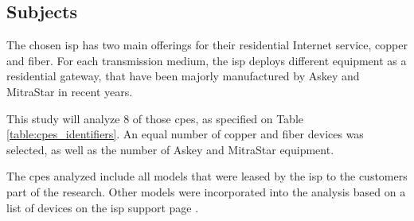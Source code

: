 \subsection{Subjects}

The chosen \gls{isp} has two main offerings for their residential Internet service, copper and fiber. For each transmission medium, the \gls{isp} deploys different equipment as a residential gateway, that have been majorly manufactured by Askey and MitraStar in recent years.

This study will analyze 8 of those \gls{cpe}s, as specified on Table \ref{table:cpes_identifiers}. An equal number of copper and fiber devices was selected, as well as the number of Askey and MitraStar equipment.

\begin{table}[h]
    \caption{Identifiers of the \gls{cpe}s}
    \label{table:cpes_identifiers}
\end{table}

The \glspl{cpe} analyzed include all models that were leased by the \gls{isp} to the customers part of the research. Other models were incorporated into the analysis based on a list of devices on the \gls{isp} support page \cite{vivo_configuraraparelhos}.

\FloatBarrier
